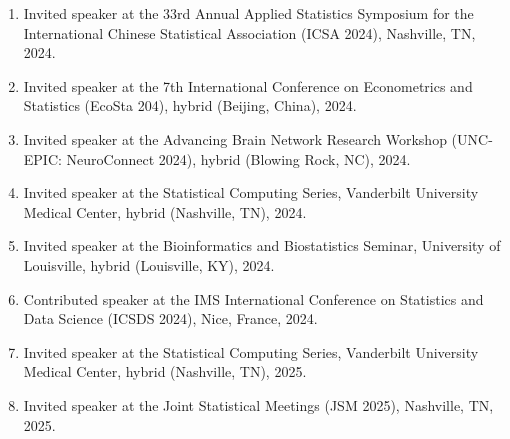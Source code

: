 \documentclass[12pt]{article}
\begin{document}
\begin{enumerate}
		\item Invited speaker at the 33rd Annual Applied Statistics 
		Symposium for the International Chinese Statistical 
		Association (ICSA 2024), Nashville, TN, 2024.
		
		\item Invited speaker at the 7th International Conference on 
		Econometrics and Statistics (EcoSta 204), hybrid (Beijing, 
		China), 2024.
		
		\item Invited speaker at the Advancing Brain Network 
		Research Workshop (UNC-EPIC: NeuroConnect 2024), hybrid 
		(Blowing Rock, NC), 2024.
		
		\item Invited speaker at the Statistical Computing Series, 
		Vanderbilt University Medical Center, hybrid (Nashville, 
		TN), 2024. 
		
		\item Invited speaker at the Bioinformatics and 
		Biostatistics Seminar, University of Louisville, hybrid 
		(Louisville, KY), 2024.
		
		\item Contributed speaker at the IMS International 
		Conference on Statistics and Data Science (ICSDS 2024), 
		Nice, France, 2024.
		
		\item Invited speaker at the Statistical Computing Series, 
		Vanderbilt University Medical Center, hybrid (Nashville, 
		TN), 2025. 
		
		\item Invited speaker at the Joint Statistical Meetings (JSM 
		2025), Nashville, TN, 2025.	
	\end{enumerate}
	
\end{document}
